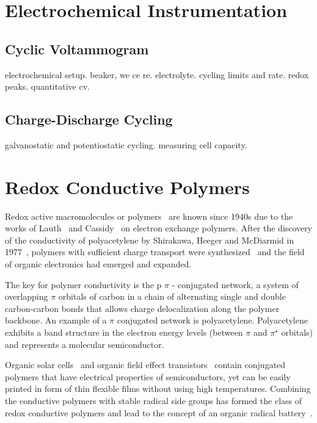\section{Electrochemical Instrumentation}
\subsection{Cyclic Voltammogram}
electrochemical setup. beaker, we ce re. electrolyte. cycling limits and rate. redox peaks. quantitative cv.
\subsection{Charge-Discharge Cycling}
galvanostatic and potentiostatic cycling. measuring cell capacity.

\section{Redox Conductive Polymers}

Redox active macromolecules or polymers~\cite{Staudinger_1920} are known since 1940s due to the works of Lauth~\cite{Lauth_1944} and Cassidy~\cite{Cassidy_1949} on electron exchange polymers. After the discovery of the conductivity of polyacetylene by Shirakawa, Heeger and McDiarmid in 1977~\cite{Shirakawa_1977}, polymers with sufficient charge transport were synthesized~\cite{} and the field of organic electronics had emerged and expanded. 

\par

The key for polymer conductivity is the p $\pi$ - conjugated network, a system of overlapping $\pi$ orbitals of carbon in a chain of alternating single and double carbon-carbon bonds that allows charge delocalization along the polymer backbone. An example of a $\pi$ conjugated network is polyacetylene. Polyacetylene exhibits a band structure in the electron energy levels (between $\pi$ and $\pi^\star$ orbitals) and represents a molecular semiconductor.

\par

Organic solar cells~\cite{Lee_1993} and organic field effect transistors~\cite{Koezuka_1987} contain conjugated polymers that have electrical properties of semiconductors, yet can be easily printed in form of thin flexible films without using high temperatures. Combining the conductive polymers with stable radical side groups has formed the class of redox conductive polymers and lead to the concept of an organic radical battery~\cite{Rohland_2021}.




